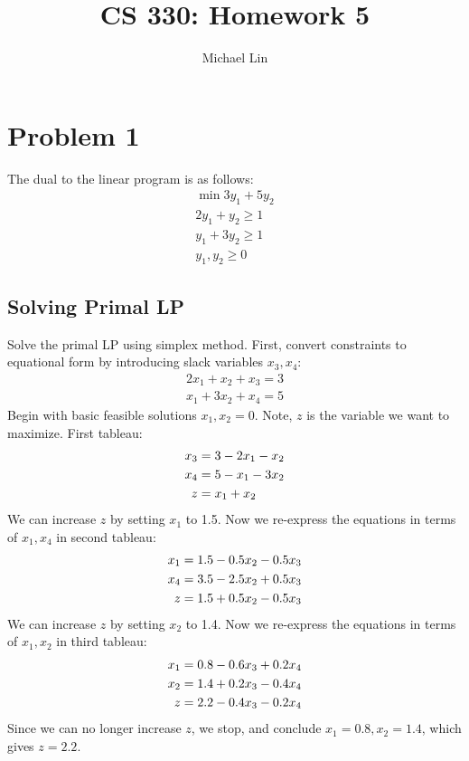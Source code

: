 \documentclass{article}
\title{CS 330: Homework 5}
\author{Michael Lin}
\begin{document}
\maketitle
\section*{Problem 1}
The dual to the linear program is as follows:
\begin{align*}
\min 3y_1+5y_2 \\
2y_1+y_2 \geq 1 \\
y_1+3y_2 \geq 1 \\
y_1,y_2 \geq 0
\end{align*}
\subsection*{Solving Primal LP}
Solve the primal LP using simplex method. First, convert constraints to equational form by introducing slack variables $x_3, x_4$:
\begin{align*}
2x_1+x_2+x_3 = 3 \\
x_1+3x_2+x_4 = 5
\end{align*}
Begin with basic feasible solutions $x_1, x_2=0$. Note, $z$ is the variable we want to maximize. First tableau:
\begin{align}
x_3 &= 3-2x_1-x_2  \\
x_4 &= 5-x_1-3x_2 \notag \\
z &= x_1 + x_2 \notag
\end{align}
We can increase $z$ by setting $x_1$ to 1.5. Now we re-express the equations in terms of $x_1, x_4$ in second tableau:
\begin{align}
x_1 &= 1.5-0.5x_2-0.5x_3 \\
x_4 &= 3.5-2.5x_2+0.5x_3 \notag \\
z &=1.5+0.5x_2-0.5x_3 \notag
\end{align}
We can increase $z$ by setting $x_2$ to 1.4. Now we re-express the equations in terms of $x_1,x_2$ in third tableau:
\begin{align}
x_1 &= 0.8-0.6x_3+0.2x_4 \\
x_2 &= 1.4+0.2x_3-0.4x_4 \notag \\
z &= 2.2-0.4x_3 -0.2x_4 \notag
\end{align}
Since we can no longer increase $z$, we stop, and conclude $x_1=0.8, x_2=1.4$, which gives $z=2.2$.
\end{document}
